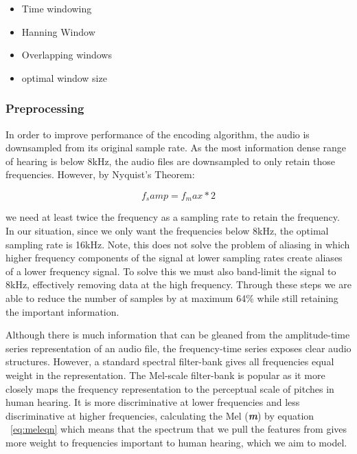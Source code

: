 \begin{itemize}
    \item Time windowing
    \item Hanning Window
    \item Overlapping windows
    \item optimal window size

\end{itemize}

\subsubsection{Preprocessing}

In order to improve performance of the encoding algorithm, the audio is downsampled from its original sample rate. As the most information dense range of hearing is below 8kHz, the audio files are downsampled to only retain those frequencies. However, by Nyquist's Theorem:

\begin{equation} \label{eq:nyq}
    f_samp = f_max * 2
\end{equation}

we need at least twice the frequency as a sampling rate to retain the frequency. In our situation, since we only want the frequencies below 8kHz, the optimal sampling rate is 16kHz. Note, this does not solve the problem of aliasing in which higher frequency components of the signal at lower sampling rates create aliases of a lower frequency signal. To solve this we must also band-limit the signal to 8kHz, effectively removing data at the high frequency. Through these steps we are able to reduce the number of samples by at maximum 64\% while still retaining the important information.

Although there is much information that can be gleaned from the amplitude-time series representation of an audio file, the frequency-time series exposes clear audio structures. However, a standard spectral filter-bank gives all frequencies equal weight in the representation. The Mel-scale filter-bank is popular as it more closely maps the frequency representation to the perceptual scale of pitches in human hearing. It is more discriminative at lower frequencies and less discriminative at higher frequencies, calculating the Mel (\textbf{\textit{m}}) by equation ~\cref{eq:meleqn} which means that the spectrum that we pull the features from gives more weight to frequencies important to human hearing, which we aim to model.

